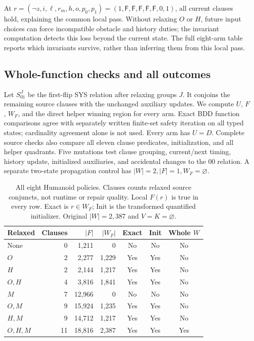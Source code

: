 At $r=(\neg z,i,\ell,r_m,h,o,p_0,p_1)
=(1,\mathsf F,\mathsf F,\mathsf F,\mathsf F,\mathsf F,0,1)$,
all current clauses hold, explaining the common local pass. Without
relaxing $O$ or $H$, future input choices can force incompatible
obstacle and history duties; the invariant computation detects this
loss beyond the current state. The full eight-arm table reports which
invariants survive, rather than inferring them from this local pass.

\subsection{Whole-function checks and all outcomes}
Let $S_{01}^J$ be the first-flip SYS relation after relaxing groups $J$.
It conjoins the remaining source clauses with the unchanged auxiliary
updates. We compute $U$, $F$, $W_F$, and the direct helper winning
region for every arm. Exact BDD function comparisons agree with
separately written finite-set safety iteration on all typed states;
cardinality agreement alone is not used. Every arm has $U=D$.
Complete source checks also compare all eleven clause predicates,
initialization, and all helper quadrants. Five mutations test clause
grouping, current/next timing, history update, initialized auxiliaries,
and accidental changes to the $00$ relation. A separate two-state
propagation control has $|W|=2,|F|=1,W_F=\varnothing$.

\begin{table}[ht]
\centering\small
\caption{All eight Humanoid policies. Clauses counts relaxed source
conjuncts, not runtime or repair quality. Local $F(r)$ is true in every
row. Exact is $r\in W_F$; Init is the transformed quantified initializer.
Original $|W|=2,387$ and $V=K=\varnothing$.}
\label{tab:humanoid-eight}
\begin{tabular}{@{}lrrrccc@{}}\toprule
Relaxed & Clauses & $|F|$ & $|W_F|$ & Exact & Init & Whole $W$\\\midrule
None & 0 & 1,211 & 0 & No & No & No\\
$O$ & 2 & 2,277 & 1,229 & Yes & Yes & No\\
$H$ & 2 & 2,144 & 1,217 & Yes & Yes & No\\
$O,H$ & 4 & 3,816 & 1,841 & Yes & Yes & No\\
$M$ & 7 & 12,966 & 0 & No & No & No\\
$O,M$ & 9 & 15,924 & 1,235 & Yes & Yes & No\\
$H,M$ & 9 & 14,712 & 1,217 & Yes & Yes & No\\
$O,H,M$ & 11 & 18,816 & 2,387 & Yes & Yes & Yes\\\bottomrule
\end{tabular}
\end{table}

